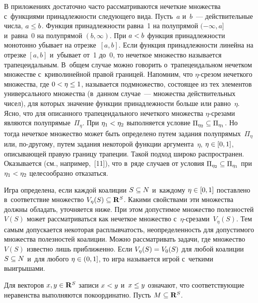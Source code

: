 \begin{multicols}{2}
В приложениях достаточно часто рассматриваются нечеткие множества 
с~функциями принадлежности следующего вида. Пусть~$a$ и~$b$~--- 
действительные числа, $a\hm\leq b$. Функция принадлежности равна~1 на 
полупрямой $(-\infty, a]$ и~равна~0 на полупрямой $(b,\infty)$. При $a\hm<b$ 
функция принадлежности монотонно убывает на отрезке~$[a,b]$. Если функция 
принадлежности линейна на отрезке $[a,b]$ и~убывает от~1 до~0, то нечеткое 
множество называется трапецеидальным. В~общем случае можно говорить 
о~трапецеидальном нечетком множестве с~криволинейной правой границей. 
Напомним, что $\eta$-сре\-зом нечеткого множества, где $0\hm <\eta \hm \leq 1$, 
называется подмножество, состоящее из тех элементов универсального 
множества (в~данном случае~--- множества действительных чисел), для 
которых значение функции принадлежности больше или равно~$\eta$. Ясно, 
что для описанного трапецеидального нечеткого множества $\eta$-сре\-за\-ми 
являются полупрямые~$\Pi_\eta$. При $\eta_1\hm< \eta_2$ выполняется условие 
$\Pi_{\eta_2}\hm\subseteq \Pi_{\eta_1}$. Но тогда нечеткое множество может 
быть определено путем задания полупрямых~$\Pi_\eta$ или, по-другому, путем 
задания некоторой функции аргумента~$\eta$, $\eta\hm\in [0,1]$, описывающей 
правую границу трапеции. Такой подход широко распространен. Оказывается 
(см., например,~[11]), что в~ряде случаев от условия $\Pi_{\eta_2}\hm\subseteq 
\Pi_{\eta_1}$ при $\eta_1\hm<\eta_2$ целесообразно отказаться. 
     
     Игра определена, если каждой коалиции $S\hm\subseteq N$ и~каждому 
$\eta\hm\in [0,1]$ поставлено в~соответствие множество $V_\eta(S)\hm\subseteq 
\mathbf{R}^S$. Какими свойствами эти множества должны обладать, 
уточняется ниже. При этом допустимое множество полезностей $V(S)$ может 
рассматриваться как нечеткое множество с~\mbox{$\eta$-сре}\-за\-ми~$V_\eta(S)$. Тем 
самым допускается некоторая расплывчатость, неопределенность для 
допустимого множества полезностей коалиции. Можно рассматривать задачи, 
где множество $V(S)$ известно лишь приближенно. Если $V_\eta(S)\hm = 
V_0(S)$ для любой коалиции $S\hm\subseteq N$ и~для любого $\eta\hm\in (0,1]$, 
то игра называется игрой с~четкими выигрышами.

\pagebreak
     
     Для векторов $x,y\hm\in \mathbf{R}^S$ записи $x\hm< y$ и~$x\hm\leq y$ 
означают, что соответствующие неравенства выполняются покоординатно. 
Пусть $M\hm\subseteq \mathbf{R}^S$.
     
     \smallskip
     

\end{multicols}
